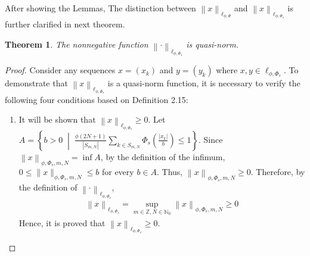 \documentclass[12pt,a4paper]{article}
\newtheorem{theorem}[definition]{Theorem}
\theoremstyle{remark}
\begin{document}
After showing the Lemmas, The distinction between $\left\lVert x \right\rVert _{\ell_{\phi,\Phi}}$ and $\left\lVert x \right\rVert _{\ell_{\phi,\Phi_s}}$ is further clarified in next theorem.

\begin{theorem}
    The nonnegative function $\left\lVert \cdot \right\rVert _{\ell_{\phi,\Phi_s}}$ is quasi-norm.
\end{theorem}

\begin{proof}
    Consider any sequences $x=\left(x_k\right)$ and $y=\left(y_k\right)$ where $x, y \in \ell_{\phi, \Phi_s}$. To demonstrate that $\left\lVert x \right\rVert _{\ell_{\phi,\Phi_s}}$ is a quasi-norm function, it is necessary to verify the following four conditions based on Definition 2.15:

    \begin{enumerate}
        \item It will be shown that $\left\lVert x \right\rVert _{\ell_{\phi,\Phi_s}}\geq 0$.
        Let $A = \left\{b>0 \;\middle|\; \frac{\phi\left(2N+1\right)}{\left|S_{m,N}\right|}\sum_{k\in S_{m,N}}\Phi_s\left(\frac{\left|x_k\right|}{b}\right) \leq 1\right\}$. Since $\left\lVert x \right\rVert _{\phi, \Phi_s, m, N}=\inf A$, by the definition of the infimum, $0 \leq \|x\|_{\phi, \Phi_s, m, N} \leq b$ for every $b \in A$. Thus, $\left\lVert x \right\rVert _{\phi, \Phi_s, m, N}\geq 0$. Therefore, by the definition of $\left\lVert \cdot \right\rVert _{\ell_{\phi,\Phi_s}}$,
        \begin{eqnarray*}
            \left\lVert x \right\rVert _{\ell_{\phi,\Phi_s}}=\sup_{m \in \mathbb{Z}, N \in \mathbb{N}_0} \left\lVert x \right\rVert _{\phi, \Phi_s, m, N}\geq 0
        \end{eqnarray*}
        Hence, it is proved that $\left\lVert x \right\rVert _{\ell_{\phi,\Phi_s}}\geq 0$.
        

\end{enumerate}
\end{proof}
\end{document}
